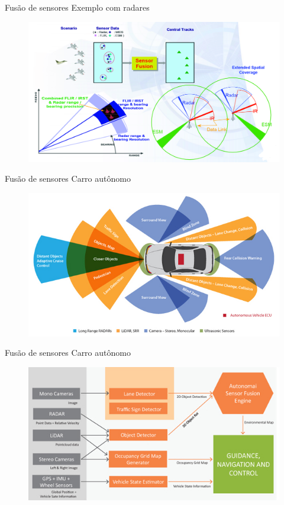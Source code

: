 \documentclass[t]{beamer}
\begin{document}
\begin{frame}{Fusão de sensores}
Exemplo com radares
\begin{figure}
	\includegraphics[width=\linewidth]{Eurofighter_sensor_fusion}
\end{figure}
\end{frame}

\begin{frame}{Fusão de sensores}
Carro autônomo
\begin{figure}
	\includegraphics[width=\linewidth]{5_TataElxsiAutonomaisensorfusionschematic}
\end{figure}
\end{frame}

\begin{frame}{Fusão de sensores}
Carro autônomo
\begin{figure}
	\includegraphics[width=\linewidth]{5_TataElxsiAutonomaiperceptionschematic}
\end{figure}
\end{frame}
\end{document}
